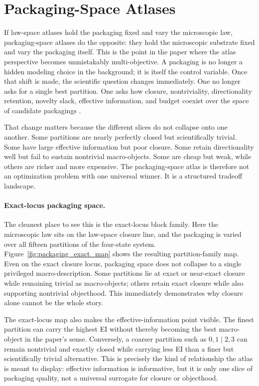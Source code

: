 \documentclass[11pt]{article}
\theoremstyle{definition}
\begin{document}
 \section{Packaging-Space Atlases}\label{sec:packaging_space}

If law-space atlases hold the packaging fixed and vary the microscopic law, packaging-space atlases do the opposite: they hold the microscopic substrate fixed and vary the packaging itself. This is the point in the paper where the atlas perspective becomes unmistakably multi-objective. A packaging is no longer a hidden modeling choice in the background; it is itself the control variable. Once that shift is made, the scientific question changes immediately. One no longer asks for a single best partition. One asks how closure, nontriviality, directionality retention, novelty slack, effective information, and budget coexist over the space of candidate packagings \cite{tsiokos2026_foundations,tsiokos2026_lay,faccin2021state,hilder2024quantitative}.

That change matters because the different slices do not collapse onto one another. Some partitions are nearly perfectly closed but scientifically trivial. Some have large effective information but poor closure. Some retain directionality well but fail to sustain nontrivial macro-objects. Some are cheap but weak, while others are richer and more expensive. The packaging-space atlas is therefore not an optimization problem with one universal winner. It is a structured tradeoff landscape.

\paragraph{Exact-locus packaging space.}
The cleanest place to see this is the exact-locus block family. Here the microscopic law sits on the law-space closure line, and the packaging is varied over all fifteen partitions of the four-state system. Figure~\ref{fig:packaging_exact_map} shows the resulting partition-family map. Even on the exact closure locus, packaging space does not collapse to a single privileged macro-description. Some partitions lie at exact or near-exact closure while remaining trivial as macro-objects; others retain exact closure while also supporting nontrivial objecthood. This immediately demonstrates why closure alone cannot be the whole story.

The exact-locus map also makes the effective-information point visible. The finest partition can carry the highest EI without thereby becoming the best macro-object in the paper's sense. Conversely, a coarser partition such as $0,1\mid 2,3$ can remain nontrivial and exactly closed while carrying less EI than a finer but scientifically trivial alternative. This is precisely the kind of relationship the atlas is meant to display: effective information is informative, but it is only one slice of packaging quality, not a universal surrogate for closure or objecthood.
\end{document}
